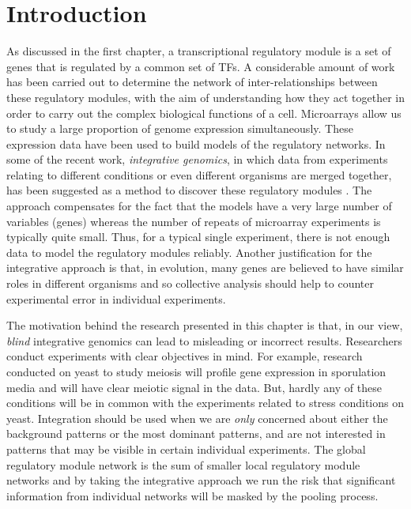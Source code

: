 \section{Introduction}

As discussed in the first chapter, a transcriptional regulatory module is a set of genes that is regulated by a common set of \acp{TF}. A considerable amount of work has been carried out to determine the network of inter-relationships between these regulatory modules, with the aim of understanding how they act together in order to carry out the complex biological functions of a cell. Microarrays allow us to study a large proportion of genome expression simultaneously. These expression data have been used to build models of the regulatory networks. In some of the recent work, \textit{integrative genomics}, in which data from experiments relating to different conditions or even different organisms are merged together, has been suggested as a method to discover these regulatory modules \citep{amos05integrative,segal04module}. The approach compensates for the fact that the models have a very large number of variables (genes) whereas the number of repeats of microarray experiments is typically quite small. Thus, for a typical single experiment, there is not enough data to model the regulatory modules reliably. Another justification for the integrative approach is that, in evolution, many genes are believed to have similar roles in different organisms and so collective analysis should help to counter experimental error in individual experiments.  

The motivation behind the research presented in this chapter is that, in our view, \textit{blind} integrative genomics can lead to misleading or incorrect results. Researchers conduct experiments with clear objectives in mind. For example, research conducted on yeast to study meiosis will profile gene expression in sporulation media and will have clear meiotic signal in the data. But, hardly any of these conditions will be in common with the experiments related to stress conditions on yeast. Integration should be used when we are \textit{only} concerned about either the background patterns or the most dominant patterns, and are not interested in patterns that may be visible in certain individual experiments. The global regulatory module network is the sum of smaller local regulatory module networks and by taking the integrative approach we run the risk that significant information from individual networks will be masked by the pooling process.

